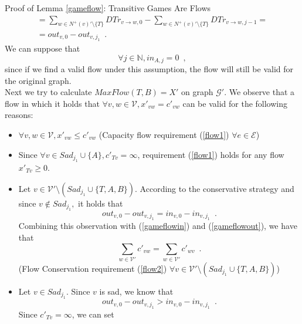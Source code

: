 \begin{sepproof}{Proof of Lemma \ref{gameflow}: Transitive Games Are Flows}
\begin{equation}
\begin{gathered}
    = \sum\limits_{w \in N^{+}\left(v\right)' \setminus \{T\}}DTr_{v \rightarrow w, 0} -
    \sum\limits_{w \in N^{+}\left(v\right)' \setminus \{T\}}DTr_{v \rightarrow w, j-1} = \\
    = out_{v, 0} - out_{v, j_1} \enspace.
  \end{gathered}
  \end{equation}
  We can suppose that
  \begin{equation}
  \label{Aincoming}
    \forall j \in \mathbb{N}, in_{A, j} = 0 \enspace,
  \end{equation}
  since if we find a valid flow under this assumption, the flow will still be valid for the original graph. \\
  Next we try to calculate $MaxFlow\left(T, B\right) = X'$ on graph $\mathcal{G}'$. We observe that a flow in which it
  holds that $\forall v, w \in \mathcal{V}, x'_{vw} = c'_{vw}$ can be valid for the following reasons:
  \begin{itemize}
    \item $\forall v,w \in \mathcal{V}, x'_{vw} \leq c'_{vw}$ (Capacity flow requirement (\ref{flow1}) $\forall e \in
    \mathcal{E}$)
    \item Since $\forall v \in Sad_{j_1} \cup \{A\}, c'_{Tv} = \infty$, requirement (\ref{flow1}) holds for any flow
    $x'_{Tv} \geq 0$.
    \item Let $v \in \mathcal{V}' \setminus \left(Sad_{j_1} \cup \{T, A, B\}\right)$. According to the conservative
    strategy and since $v \notin Sad_{j_1},$ it holds that
    \begin{equation*}
      out_{v, 0} - out_{v, j_1} = in_{v, 0} - in_{v, j_1} \enspace.
    \end{equation*}
    Combining this observation with (\ref{gameflowin}) and (\ref{gameflowout}), we have that
    \begin{equation*}
      \sum\limits_{w \in \mathcal{V}'}c'_{vw} = \sum\limits_{w \in \mathcal{V}'}c'_{wv} \enspace.
    \end{equation*}
    (Flow Conservation requirement (\ref{flow2}) $\forall v \in \mathcal{V}' \setminus \left(Sad_{j_1}
    \cup \{T, A, B\}\right)$)
    \item Let $v \in Sad_{j_1}$. Since $v$ is sad, we know that
    \begin{equation*}
      out_{v, 0} - out_{v, j_1} > in_{v, 0} - in_{v, j_1} \enspace.
    \end{equation*}
    Since $c'_{Tv} = \infty$, we can set
    \begin{equation*}

\end{equation*}
\end{itemize}
\end{sepproof}
